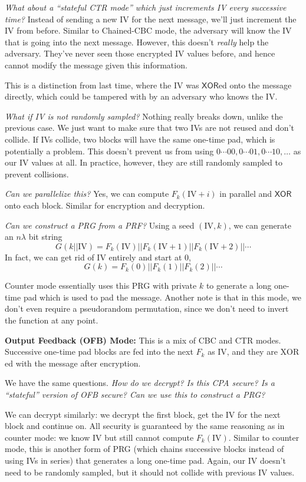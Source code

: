 \emph{What about a ``stateful CTR mode'' which just increments IV every successive time?} Instead of sending a new IV for the next message, we'll just increment the IV from before. Similar to Chained-CBC mode, the adversary will know the IV that is going into the next message. However, this doesn't \emph{really} help the adversary. They've never seen those encrypted IV values before, and hence cannot modify the message given this information.

This is a distinction from last time, where the IV was $\mathsf{XOR}$ed onto the message directly, which could be tampered with by an adversary who knows the IV.

\emph{What if IV is not randomly sampled?} Nothing really breaks down, unlike the previous case. We just want to make sure that two IVs are not reused and don't collide. If IVs collide, two blocks will have the same one-time pad, which is potentially a problem. This doesn't prevent us from using $0\cdots 00, 0\cdots 01, 0\cdots 10, \dots$ as our IV values at all. In practice, however, they are still randomly sampled to prevent collisions.

\emph{Can we parallelize this?} Yes, we can compute $F_k(\mathrm{IV} + i)$ in parallel and $\mathsf{XOR}$ onto each block. Similar for encryption and decryption.

\emph{Can we construct a PRG from a PRF?} Using a seed $(\mathrm{IV}, k)$, we can generate an $n\lambda$ bit string
\[G(k||\mathrm{IV}) = F_k(\mathrm{IV})||F_k(\mathrm{IV} + 1)||F_k(\mathrm{IV} + 2)||\cdots\]
In fact, we can get rid of IV entirely and start at $0$,
\[G(k) = F_k(0)||F_k(1)||F_k(2)||\cdots\]

Counter mode essentially uses this PRG with private $k$ to generate a long one-time pad which is used to pad the message. Another note is that in this mode, we don't even require a pseudorandom permutation, since we don't need to invert the function at any point.

\textbf{Output Feedback (OFB) Mode:} This is a mix of CBC and CTR modes. Successive one-time pad blocks are fed into the next $F_k$ as IV, and they are $\mathrm{XOR}$ed with the message after encryption.


We have the same questions. \emph{How do we decrypt? Is this CPA secure? Is a ``stateful'' version of OFB secure? Can we use this to construct a PRG?}

We can decrypt similarly: we decrypt the first block, get the IV for the next block and continue on. All security is guaranteed by the same reasoning as in counter mode: we know IV but still cannot compute $F_k(\mathrm{IV})$. Similar to counter mode, this is another form of PRG (which chains successive blocks instead of using IVs in series) that generates a long one-time pad. Again, our IV doesn't need to be randomly sampled, but it should not collide with previous IV values.

